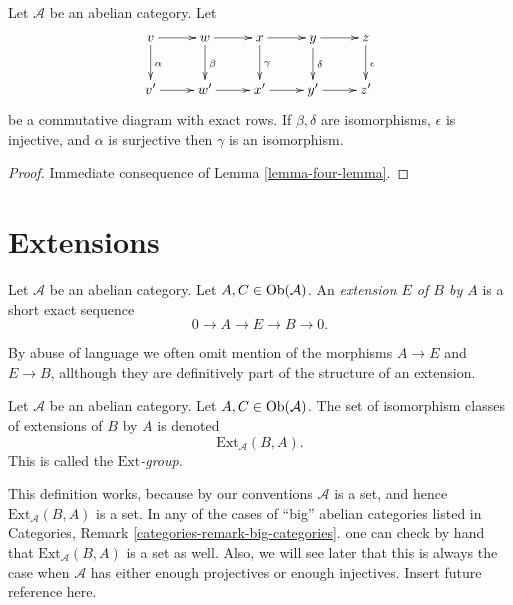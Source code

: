 \begin{lemma}
\label{lemma-five-lemma}
Let $\mathcal{A}$ be an abelian category. Let
$$
\xymatrix{
v \ar[r] \ar[d]^\alpha &
w \ar[r] \ar[d]^\beta &
x \ar[r] \ar[d]^\gamma &
y \ar[r] \ar[d]^\delta &
z \ar[d]^\epsilon \\
v' \ar[r] & w' \ar[r] & x' \ar[r] & y' \ar[r] & z'
}
$$
be a commutative diagram with exact rows. If $\beta, \delta$
are isomorphisms, $\epsilon$ is injective, and $\alpha$ is surjective
then $\gamma$ is an isomorphism.
\end{lemma}

\begin{proof}
Immediate consequence of
Lemma \ref{lemma-four-lemma}.
\end{proof}








\section{Extensions}
\label{section-extensions}

\begin{definition}
\label{definition-extension}
Let $\mathcal{A}$ be an abelian category.
Let $A, C \in \mathop{\rm Ob}\nolimits(\mathcal{A})$.
An {\it extension $E$ of $B$ by $A$} is a short
exact sequence
$$
0 \to A \to E \to B \to 0.
$$
\end{definition}

\noindent
By abuse of language we often omit mention of the
morphisms $A \to E$ and $E \to B$, allthough they are
definitively part of the structure of an extension.

\begin{definition}
\label{definition-ext-group}
Let $\mathcal{A}$ be an abelian category.
Let $A, C \in \mathop{\rm Ob}\nolimits(\mathcal{A})$.
The set of isomorphism classes of extensions
of $B$ by $A$ is denoted
$$
\text{Ext}_\mathcal{A}(B, A).
$$
This is called the {\it $\text{Ext}$-group}.
\end{definition}

\noindent
This definition works, because by our conventions
$\mathcal{A}$ is a set, and hence
$\text{Ext}_\mathcal{A}(B, A)$ is a set.
In any of the cases of ``big'' abelian categories
listed in Categories, Remark \ref{categories-remark-big-categories}.
one can check by hand that $\text{Ext}_\mathcal{A}(B, A)$
is a set as well. Also, we will see later that this is
always the case when $\mathcal{A}$ has either enough projectives
or enough injectives. Insert future reference here.

